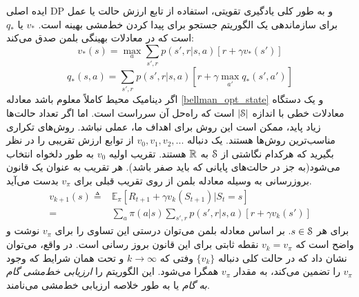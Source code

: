 ایده اصلی DP و به طور کلی یادگیری تقویتی‌، استفاده از تابع ارزش حالت یا عمل برای سازماندهی یک الگوریتم جستجو برای پیدا کردن خط‌مشی بهینه است.
$v_*$
یا
$q_*$
است
که در معادلات بهینگی بلمن صدق می‌کند:
\begin{equation}
v_{*}(s) = \max_{a} \sum_{s',r} p(s',r | s,a)[r + \gamma v_*(s')]
\label{bellman_opt_state}
\end{equation}
\begin{equation}
q_{*}(s,a) = \sum_{s',r} p(s',r | s,a)[r + \gamma \max_{a'} q_* (s',a')]
\label{bellman_opt_action}
\end{equation}
اگر دینامیک محیط کاملاً معلوم باشد معادله
\ref{bellman_opt_state}
و
یک دستگاه معادلات خطی با اندازه
 $|\EuScript{S}|$
  است
 که راه‌حل آن سرراست است. اما اگر تعداد حالت‌ها زیاد پاید، ممکن است این روش 
 برای اهداف ما، عملی نباشد. روش‌های تکراری مناسب‌ترین روش‌ها هستند. یک دنباله $ v_0 , v_1 , v_2 , ...$ 
از توابع ارزش تقریبی
را در نظر بگیرید که هرکدام نگاشتی از
$\EuScript{S}$ 
به 
$\mathbb{R}$
 هستند.
تقریب اولیه $v_0$
به طور دلخواه انتخاب می‌شود(به جز در حالت‌های پایانی که باید صفر باشد). هر تقریب به عنوان یک قانون بروزرسانی به وسیله معادله بلمن از روی تقریب قبلی برای
$v_\pi$
بدست می‌آید. 
\begin{align}
v_{k+1}(s) \triangleq & \mathbb{E}_{\pi} [R_{t+1} + \gamma v_k(S_{t+1}) | S_t=s]  \nonumber \\
=& \sum_{a} \pi(a|s) \sum_{s',r} p(s',r | s,a)[r + \gamma v_k(s')]
\end{align}
 برای هر 
 $s \in \EuScript{S}$.
 بر اساس معادله بلمن می‌توان درستی این تساوی را برای 
$v_{\pi}$
نوشت و واضح است که 
 $v_k = v_{\pi}$
 نقطه ثابتی برای این قانون بروز رسانی است.
 در واقع، می‌توان نشان داد که در حالت کلی دنباله 
 $\{ v_k \}$
وفتی که 
$ k \rightarrow \infty $
و تحت همان شرایط که وجود 
$v_{\pi}$
را تضمین می‌کند، به مقدار 
$v_{\pi}$
همگرا می‌شود.  این الگوریتم را 
\textit{ارزیابی خط‌مشی گام به گام}
 یا به طور خلاصه 
ارزیابی خط‌مشی
 می‌نامند.




